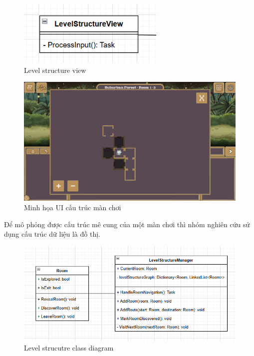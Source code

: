 \begin{figure}[H]
	\centering
	\includegraphics[width=7cm]{Images/LevelStructureView.png}
	\vspace{0.5cm}
	\caption{Level structure view}
\end{figure}

\begin{figure}[H]
	\centering
	\includegraphics[width=13cm]{Images/LevelStructureUI.png}
	\vspace{0.5cm}
	\caption{Minh họa UI cấu trúc màn chơi}
\end{figure}

Để mô phỏng được cấu trúc mê cung của một màn chơi thì nhóm nghiên cứu sử dụng cấu trúc dữ liệu là đồ thị.

\begin{figure}[H]
	\centering
	\includegraphics[width=13cm]{Images/LevelStructureManager.png}
	\vspace{0.5cm}
	\caption{Level strucutre class diagram}
\end{figure}